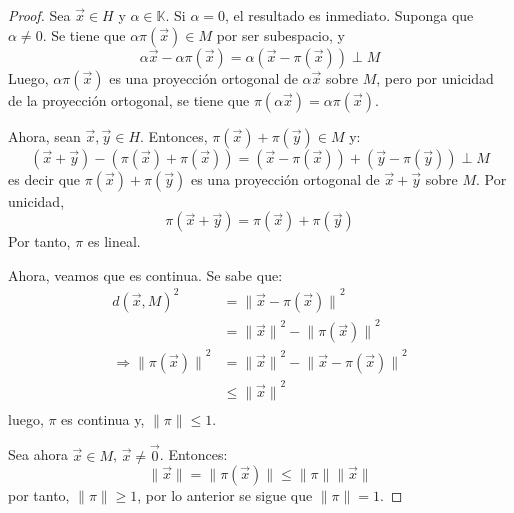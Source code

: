 \documentclass[12pt]{report}
\theoremstyle{largebreak}
\newcommand\norm[1]{\ensuremath{\|#1\|}}
\begin{document}
    \begin{proof}
        Sea $\vec{x}\in H$ y $\alpha\in\mathbb{K}$. Si $\alpha=0$, el resultado es inmediato. Suponga que $\alpha\neq 0$. Se tiene que $\alpha\pi(\vec{x})\in M$ por ser subespacio, y
        \begin{equation*}
            \alpha\vec{x}-\alpha\pi(\vec{x})=\alpha(\vec{x}-\pi(\vec{x}))\perp M
        \end{equation*}
        Luego, $\alpha\pi(\vec{x})$ es una proyección ortogonal de $\alpha\vec{x}$ sobre $M$, pero por unicidad de la proyección ortogonal, se tiene que $\pi(\alpha\vec{x})=\alpha\pi(\vec{x})$.

        Ahora, sean $\vec{x},\vec{y}\in H$. Entonces, $\pi(\vec{x})+\pi(\vec{y})\in M$ y:
        \begin{equation*}
            (\vec{x}+\vec{y})-(\pi(\vec{x})+\pi(\vec{x}))=(\vec{x}-\pi(\vec{x}))+(\vec{y}-\pi(\vec{y}))\perp M
        \end{equation*}
        es decir que $\pi(\vec{x})+\pi(\vec{y})$ es una proyección ortogonal de $\vec{x}+\vec{y}$ sobre $M$. Por unicidad,
        \begin{equation*}
            \pi(\vec{x}+\vec{y})=\pi(\vec{x})+\pi(\vec{y})
        \end{equation*}
        Por tanto, $\pi$ es lineal.


        Ahora, veamos que es continua. Se sabe que:
        \begin{equation*}
            \begin{split}
                d(\vec{x},M)^2&=\norm{\vec{x}-\pi(\vec{x})}^2\\
                &=\norm{\vec{x}}^2-\norm{\pi(\vec{x})}^2\\
                \Rightarrow \norm{\pi(\vec{x})}^2&=\norm{\vec{x}}^2-\norm{\vec{x}-\pi(\vec{x})}^2\\
                &\leq\norm{\vec{x}}^2\\
            \end{split}
        \end{equation*}
        luego, $\pi$ es continua y, $\norm{\pi}\leq 1$.

        Sea ahora $\vec{x}\in M$, $\vec{x}\neq\vec{0}$. Entonces:
        \begin{equation*}
            \norm{\vec{x}}=\norm{\pi(\vec{x})}\leq\norm{\pi}\norm{\vec{x}}
        \end{equation*}
        por tanto, $\norm{\pi}\geq 1$, por lo anterior se sigue que $\norm{\pi}=1$.


\end{proof}
\end{document}

